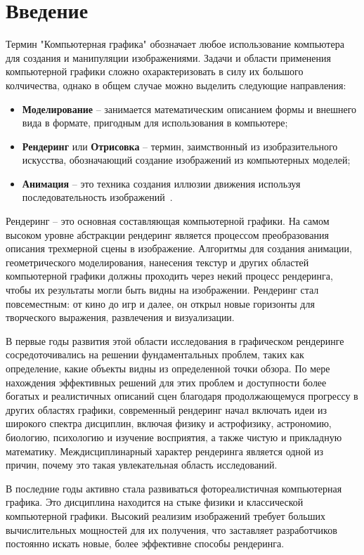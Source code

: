 \chapter{Введение}

Термин "Компьютерная графика" обозначает любое использование компьютера для создания 
и манипуляции изображениями. Задачи и области применения компьютерной графики 
сложно охарактеризовать в силу их большого колчичества, однако в общем случае можно выделить 
следующие направления:
\begin{itemize}
    \item \textbf{Моделирование} -- занимается математическим описанием формы и внешнего вида
в формате, пригодным для использования в компьютере;
    \item \textbf{Рендеринг} или \textbf{Отрисовка} -- термин, заимствонный из изобразительного 
искусства, обозначающий создание изображений из компьютерных моделей;
    \item \textbf{Анимация} -- это техника создания иллюзии движения используя последовательность изображений~\cite{FoCG}.
\end{itemize}

Рендеринг -- это основная составляющая компьютерной графики. На самом высоком уровне абстракции рендеринг является процессом преобразования описания трехмерной сцены в изображение. Алгоритмы для создания анимации, геометрического моделирования, нанесения текстур и других областей компьютерной графики должны проходить через некий процесс рендеринга, чтобы их результаты могли быть видны на изображении. Рендеринг стал повсеместным: от кино до игр и далее, он открыл новые горизонты для творческого выражения, развлечения и визуализации.

В первые годы развития этой области исследования в графическом рендеринге сосредоточивались на решении фундаментальных проблем, таких как определение, какие объекты видны из определенной точки обзора. По мере нахождения эффективных решений для этих проблем и доступности более богатых и реалистичных описаний сцен благодаря продолжающемуся прогрессу в других областях графики, современный рендеринг начал включать идеи из широкого спектра дисциплин, включая физику и астрофизику, астрономию, биологию, психологию и изучение восприятия, а также чистую и прикладную математику. Междисциплинарный характер рендеринга является одной из причин, почему это такая увлекательная область исследований.

В последние годы активно стала развиваться фотореалистичная компьютерная графика. Это дисциплина находится на стыке физики и классической компьютерной графики. Высокий реализим изображений требует больших вычислительных мощностей для их получения, что заставляет разработчиков постоянно искать новые, более эффективне способы рендеринга.

